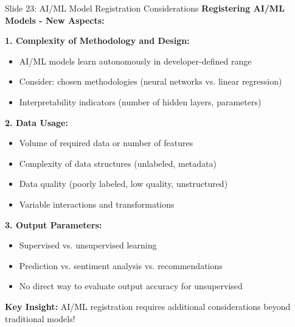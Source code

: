 \documentclass[8pt]{beamer}
\begin{document}
	\begin{frame}{Slide 23: AI/ML Model Registration Considerations}
		\fontsize{6.5}{7.5}\selectfont
		\textbf{Registering AI/ML Models - New Aspects:}
		
		\vspace{0.1cm}
		\textbf{1. Complexity of Methodology and Design:}
		\begin{itemize}
			\item AI/ML models learn autonomously in developer-defined range
			\item Consider: chosen methodologies (neural networks vs. linear regression)
			\item Interpretability indicators (number of hidden layers, parameters)
		\end{itemize}
		
		\vspace{0.1cm}
		\textbf{2. Data Usage:}
		\begin{itemize}
			\item Volume of required data or number of features
			\item Complexity of data structures (unlabeled, metadata)
			\item Data quality (poorly labeled, low quality, unstructured)
			\item Variable interactions and transformations
		\end{itemize}
		
		\vspace{0.1cm}
		\textbf{3. Output Parameters:}
		\begin{itemize}
			\item Supervised vs. unsupervised learning
			\item Prediction vs. sentiment analysis vs. recommendations
			\item No direct way to evaluate output accuracy for unsupervised
		\end{itemize}
		
		\textcolor{myblue}{\textbf{Key Insight:}} AI/ML registration requires \textcolor{myblue}{additional considerations beyond traditional models}!
	\end{frame}
	
\end{document}
